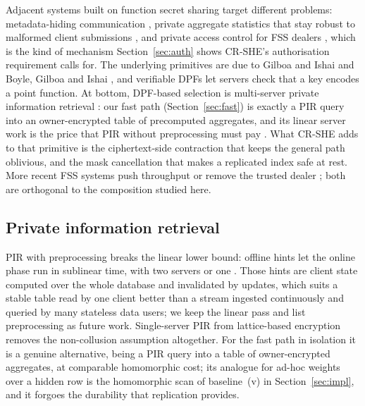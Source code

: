 \documentclass[a4paper,fleqn]{cas-dc}
\begin{document}
Adjacent systems built on function secret sharing target different problems:
metadata-hiding communication \citep{express}, private aggregate statistics
that stay robust to malformed client submissions
\citep{corrigan2017prio,boneh2021lightweight}, and private access control for
FSS dealers \citep{pacl}, which is the kind of mechanism
Section~\ref{sec:auth} shows CR-SHE's authorisation requirement calls for. The
underlying primitives are due to Gilboa and Ishai
\citep{gilboa2014distributed} and Boyle, Gilboa and Ishai
\citep{boyle2015function,boyle2016function}, and verifiable DPFs
\citep{decastro2022lightweight} let servers check that a key encodes a point
function. At bottom, DPF-based selection is multi-server private information
retrieval \citep{chor1998private}: our fast path (Section~\ref{sec:fast}) is
exactly a PIR query into an owner-encrypted table of precomputed aggregates,
and its linear server work is the price that PIR without preprocessing must
pay \citep{beimel2000reducing}. What CR-SHE adds to that primitive is the
ciphertext-side contraction that keeps the general path oblivious, and the
mask cancellation that makes a replicated index safe at rest. More recent FSS
systems push throughput \citep{storrier2023grotto} or remove the trusted
dealer \citep{doerner2017scaling}; both are orthogonal to the composition
studied here.

\subsection{Private information retrieval}
PIR with preprocessing breaks the linear lower bound: offline hints let the
online phase run in sublinear time, with two servers
\citep{corrigan2020private} or one \citep{corrigan2022single,zhou2024piano}.
Those hints are client state computed over the whole database and invalidated
by updates, which suits a stable table read by one client better than a stream
ingested continuously and queried by many stateless data users; we keep the
linear pass and list preprocessing as future work. Single-server PIR from
lattice-based encryption
\citep{angel2018pir,mughees2021onionpir,menon2022spiral,davidson2023frodopir}
removes the non-collusion assumption altogether. For the fast path in
isolation it is a genuine alternative, being a PIR query into a table of
owner-encrypted aggregates, at comparable homomorphic cost; its analogue for
ad-hoc weights over a hidden row is the homomorphic scan of baseline~(v) in
Section~\ref{sec:impl}, and it forgoes the durability that replication
provides.
\end{document}

